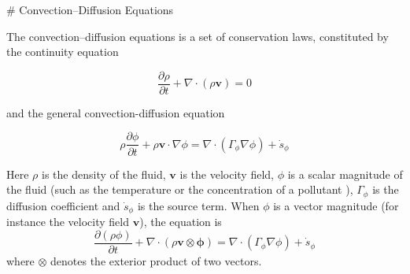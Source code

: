 # Convection--Diffusion Equations

The convection--diffusion equations is a set of conservation laws, constituted
by the continuity equation 

$$
\frac{\partial \rho}{\partial t} + \nabla \cdot (\rho \mathbf{v}) = 0
$$ 

and the general convection-diffusion equation 

$$
\rho \frac{\partial \phi}{\partial t} + \rho \mathbf{v} \cdot \nabla \phi = \nabla \cdot \left( \Gamma_\phi \nabla \phi \right) + \dot{s}_\phi
$$ 

Here $\rho$ is the density of the fluid, $\mathbf{v}$ is the velocity field,
$\phi$ is a scalar magnitude of the fluid (such as the temperature or the
concentration of a pollutant ), $\Gamma_\phi$ is the diffusion coefficient and
$\dot{s}_\phi$ is the source term. When $\phi$ is a vector magnitude (for
instance the velocity field $\mathbf{v}$), the equation is $$\frac{\partial(\rho
\phi)}{\partial t} + \nabla \cdot (\rho \mathbf{v} \otimes \mathbf{\phi}) =
\nabla \cdot \left( \Gamma_\phi \nabla \phi \right) + \dot{s}_\phi$$ where
$\otimes$ denotes the exterior product of two vectors.

